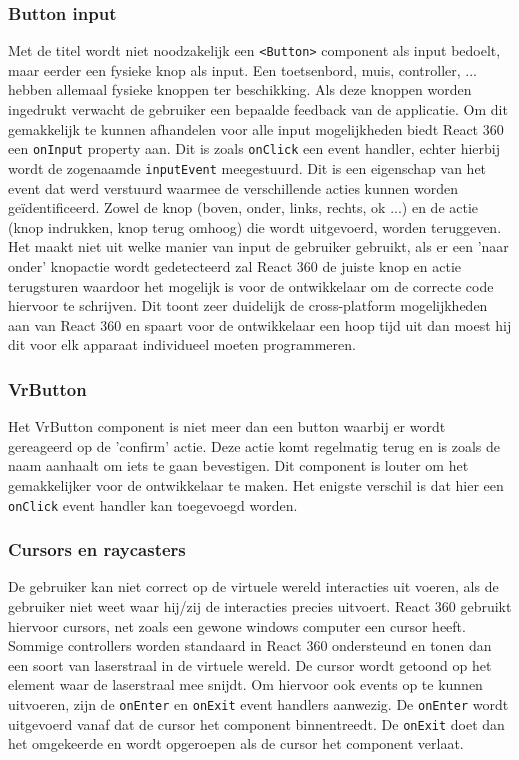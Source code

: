 \subsubsection{Button input}
Met de titel wordt niet noodzakelijk een \lstinline[basicstyle=\ttfamily\color{red}]|<Button>| component als input bedoelt, maar eerder een fysieke knop als input. Een toetsenbord, muis, controller, ... hebben allemaal fysieke knoppen ter beschikking. Als deze knoppen worden ingedrukt verwacht de gebruiker een bepaalde feedback van de applicatie. Om dit gemakkelijk te kunnen afhandelen voor alle input mogelijkheden biedt React 360 een \lstinline[basicstyle=\ttfamily\color{red}]|onInput| property aan. Dit is zoals \lstinline[basicstyle=\ttfamily\color{red}]|onClick| een event handler, echter hierbij wordt de zogenaamde \lstinline[basicstyle=\ttfamily\color{red}]|inputEvent| meegestuurd. Dit is een eigenschap van het event dat werd verstuurd waarmee de verschillende acties kunnen worden geïdentificeerd. Zowel de knop (boven, onder, links, rechts, ok ...) en de actie (knop indrukken, knop terug omhoog) die wordt uitgevoerd, worden teruggeven. Het maakt niet uit welke manier van input de gebruiker gebruikt, als er een 'naar onder' knopactie wordt gedetecteerd zal React 360 de juiste knop en actie terugsturen waardoor het  mogelijk is voor de ontwikkelaar om de correcte code hiervoor te schrijven. Dit toont zeer duidelijk de cross-platform mogelijkheden aan van React 360 en spaart voor de ontwikkelaar een hoop tijd uit dan moest hij dit voor elk apparaat individueel moeten programmeren.

\subsubsection{VrButton}
Het VrButton component is niet meer dan een button waarbij er wordt gereageerd op de 'confirm' actie. Deze actie komt regelmatig terug en is zoals de naam aanhaalt om iets te gaan bevestigen. Dit component is louter om het gemakkelijker voor de ontwikkelaar te maken. Het enigste verschil is dat hier een \lstinline[basicstyle=\ttfamily\color{red}]|onClick| event handler kan toegevoegd worden.

\subsubsection{Cursors en raycasters}
De gebruiker kan niet correct op de virtuele wereld interacties uit voeren, als de gebruiker niet weet waar hij/zij de interacties precies uitvoert. React 360 gebruikt hiervoor cursors, net zoals een gewone windows computer een cursor heeft. Sommige controllers worden standaard in React 360 ondersteund en tonen dan een soort van laserstraal in de virtuele wereld. De cursor wordt getoond op het element waar de laserstraal mee snijdt. Om hiervoor ook events op te kunnen uitvoeren, zijn de \lstinline[basicstyle=\ttfamily\color{red}]|onEnter| en \lstinline[basicstyle=\ttfamily\color{red}]|onExit| event handlers aanwezig. De \lstinline[basicstyle=\ttfamily\color{red}]|onEnter| wordt uitgevoerd vanaf dat de cursor het component binnentreedt. De \lstinline[basicstyle=\ttfamily\color{red}]|onExit| doet dan het omgekeerde en wordt opgeroepen als de cursor het component verlaat.


